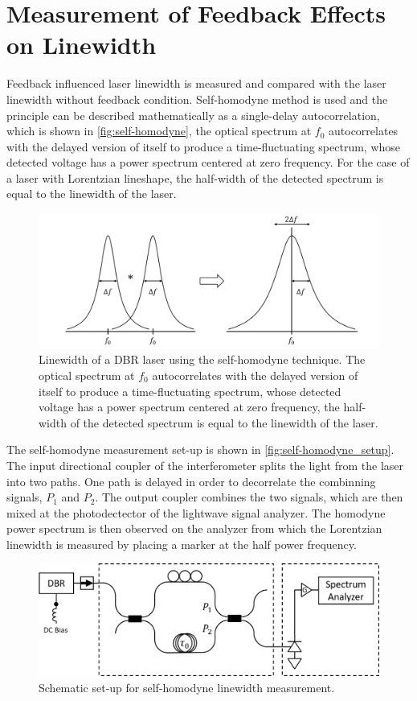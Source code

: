 
\section{Measurement of Feedback Effects on Linewidth}\label{sec:linewidth_measurement}
Feedback influenced laser linewidth is measured and compared with the laser linewidth without feedback condition. Self-homodyne method is used and the principle can be described mathematically as a single-delay autocorrelation, which is shown in \autoref{fig:self-homodyne}, the optical spectrum at $f_0$ autocorrelates with the delayed version of itself to produce a time-fluctuating spectrum, whose detected voltage has a power spectrum centered at zero frequency. For the case of a laser with Lorentzian lineshape, the half-width of the detected spectrum is equal to the linewidth of the laser.
\begin{figure}[ht]
    \centering
    \includegraphics[width=.8\linewidth]{figures/self-homodyne.png}
    \caption{Linewidth of a DBR laser using the self-homodyne technique. The optical spectrum at $f_0$ autocorrelates with the delayed version of itself to produce a time-fluctuating spectrum, whose detected voltage has a power spectrum centered at zero frequency, the half-width of the detected spectrum is equal to the linewidth of the laser.}
    \label{fig:self-homodyne}
\end{figure}

The self-homodyne measurement set-up is shown in \autoref{fig:self-homodyne_setup}. The input directional coupler of the interferometer splits the light from the laser into two paths. One path is delayed in order to decorrelate the combinning signals, $P_1$ and $P_2$. The output coupler combines the two signals, which are then mixed at the photodectector of the lightwave signal analyzer.  The homodyne power spectrum is then observed on the analyzer from which the Lorentzian linewidth is measured by placing a marker at the half power frequency.
\begin{figure}[ht]
    \centering
    \includegraphics[width=.8\linewidth]{figures/self-homodyne_setup.png}
    \caption{Schematic set-up for self-homodyne linewidth measurement.}
    \label{fig:self-homodyne_setup}
\end{figure}

